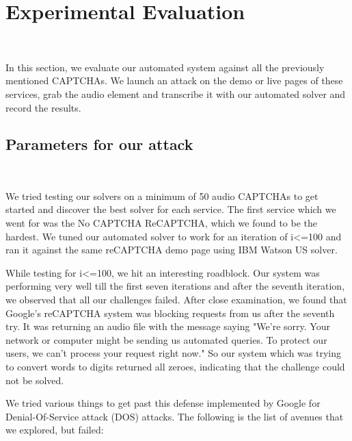 \section{Experimental Evaluation}\mbox{} \
\label{sec:evaluation}

In this section, we evaluate our automated system against all the previously mentioned CAPTCHAs. We launch an attack on the demo or live pages of these services, grab the audio element and transcribe it with our automated solver and record the results.\newline

\subsection{Parameters for our attack} \mbox{} \

We tried testing our solvers on a minimum of 50 audio CAPTCHAs to get started and discover the best solver for each service. The first service which we went for was the No CAPTCHA ReCAPTCHA, which we found to be the hardest. We tuned our automated solver to work for an iteration of i<=100 and ran it against the same reCAPTCHA demo page using IBM Watson US solver.\newline

While testing for i<=100, we hit an interesting roadblock. Our system was performing very well till the first seven iterations and after the seventh iteration, we observed that all our challenges failed. After close examination, we found that Google's reCAPTCHA system was blocking requests from us after the seventh try. It was returning an audio file with the message saying "We're sorry. Your network or computer might be sending us automated queries. To protect our users, we can't process your request right now." So our system which was trying to convert words to digits returned all zeroes, indicating that the challenge could not be solved.\newline

We tried various things to get past this defense implemented by Google for Denial-Of-Service attack (DOS) attacks. The following is the list of avenues that we explored, but failed:\newline

